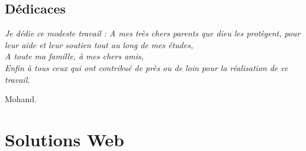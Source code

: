 \documentclass[11pt,a4paper,onecolumn,openright,oneside]{report}
\begin{document}
    \chapter*{\huge Dédicaces}
	
	\begin{center}
		\it \Large
		Je dédie ce modeste travail :
		A mes très chers parents que dieu les
		protègent, pour leur aide et leur soutien tout au long
		de mes études,\\
		
		A toute ma famille, à mes chers amis,\\
		
		Enfin à tous ceux qui ont contribué de près
		ou de loin pour la réalisation de ce travail.\\
		
		\leftskip=12cm
		
		Mohand.
		
		\leftskip=0cm
		
	\end{center}
	
	\tableofcontents
	\listoffigures
	\listoftables

	\pagestyle{fancy}
	\fancyhead{}
	
	\renewcommand{\chaptermark}[1]{\markboth{\bsc{\chaptername~\thechapter{} :} #1}{}}
	
	\rhead[\textsl{\leftmark}]{\textsl{\rightmark}}
	\lhead[\textsl{\rightmark}]{\textsl{\leftmark}}
	
	\renewcommand{\headrulewidth}{1.2pt}
	
	\newcommand\blfootnote[1]{
		\begingroup
		\renewcommand\thefootnote{}\footnote{#1}
		\addtocounter{footnote}{-1}
		\endgroup
	}
        \part{Solutions Web}
            

        

	
\end{document}
